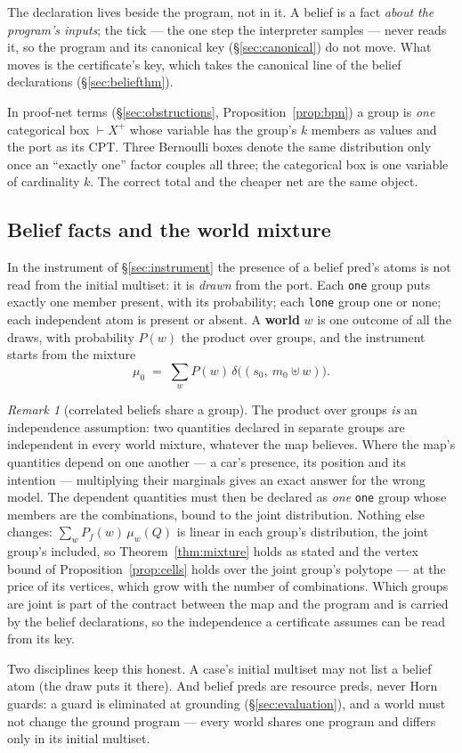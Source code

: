 \documentclass[11pt]{article}
\theoremstyle{plain}
\theoremstyle{definition}
\theoremstyle{remark}
\newtheorem*{remark}{Remark}
\begin{document}
The declaration lives beside the program, not in it. A belief is a fact
\emph{about the program's inputs}; the tick --- the one step the
interpreter samples --- never reads it, so the program and its canonical
key (\S\ref{sec:canonical}) do not move. What moves is the certificate's
key, which takes the canonical line of the belief declarations
(\S\ref{sec:beliefthm}).

In proof-net terms (\S\ref{sec:obstructions}, Proposition~\ref{prop:bpn})
a group is \emph{one} categorical box $\vdash X^{+}$ whose variable has
the group's $k$ members as values and the port as its CPT. Three
Bernoulli boxes denote the same distribution only once an
``exactly one'' factor couples all three; the categorical box is one
variable of cardinality $k$. The correct total and the cheaper net are
the same object.

\subsection{Belief facts and the world mixture}\label{sec:worlds}

In the instrument of \S\ref{sec:instrument} the presence of a belief
pred's atoms is not read from the initial multiset: it is \emph{drawn}
from the port. Each \texttt{one} group puts exactly one member present,
with its probability; each \texttt{lone} group one or none; each
independent atom is present or absent. A \textbf{world} $w$ is one
outcome of all the draws, with probability $P(w)$ the product over
groups, and the instrument starts from the mixture
\[
  \mu_0 \;=\; \sum_w P(w)\,\delta\big((s_0,\ m_0 \uplus w)\big).
\]

\begin{remark}[correlated beliefs share a group]
The product over groups \emph{is} an independence assumption: two
quantities declared in separate groups are independent in every world
mixture, whatever the map believes. Where the map's quantities depend
on one another --- a car's presence, its position and its intention ---
multiplying their marginals gives an exact answer for the wrong model.
The dependent quantities must then be declared as \emph{one}
\texttt{one} group whose members are the combinations, bound to the
joint distribution. Nothing else changes: $\sum_w P_f(w)\,\mu_w(Q)$ is
linear in each group's distribution, the joint group's included, so
Theorem~\ref{thm:mixture} holds as stated and the vertex bound of
Proposition~\ref{prop:cells} holds over the joint group's polytope ---
at the price of its vertices, which grow with the number of
combinations. Which groups are joint is part of the contract between
the map and the program and is carried by the belief declarations, so
the independence a certificate assumes can be read from its key.
\end{remark}
Two disciplines keep this honest. A case's initial multiset may not list
a belief atom (the draw puts it there). And belief preds are resource
preds, never Horn guards: a guard is eliminated at grounding
(\S\ref{sec:evaluation}), and a world must not change the ground
program --- every world shares one program and differs only in its
initial multiset.
\end{document}
